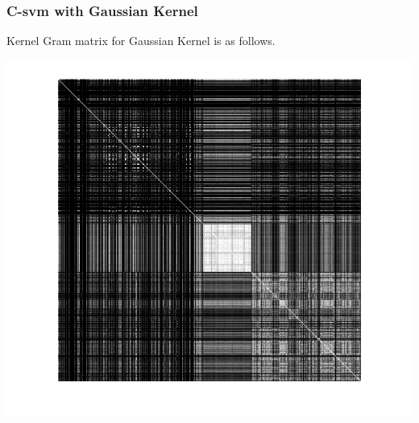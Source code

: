 \documentclass{article}
\begin{document}
\subsubsection{C-svm with Gaussian Kernel}
Kernel Gram matrix for Gaussian Kernel is as follows.
\begin{center}
\includegraphics[scale=.6]{Classification/2/c_g/kgm}
\end{center}
\end{document}
